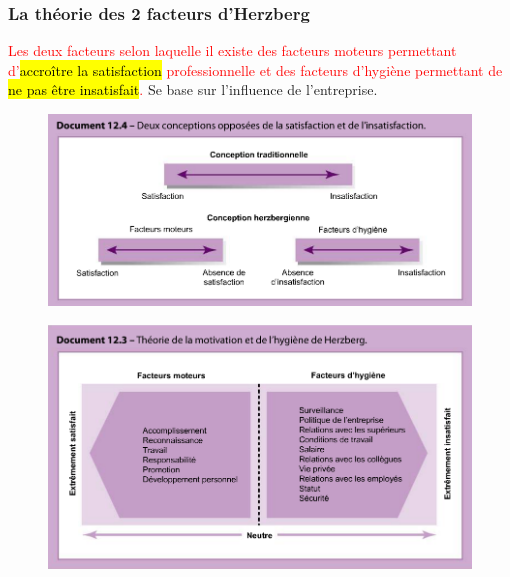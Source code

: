 \documentclass[letterpaper, 12pt]{article}
\newcommand{\red}[1]{
	\textcolor{red}{#1}
}
\begin{document}
		\subsubsection{La théorie des 2 facteurs d'Herzberg}
			\red{Les deux facteurs selon laquelle il existe des facteurs moteurs permettant d'\hl{accro\^itre 
				la satisfaction} professionnelle et des facteurs d'hygiène permettant de \hl{ne pas
				\^etre insatisfait}.} Se base sur l'influence de l'entreprise.
			\begin{figure}[H]
				\centering
				\includegraphics[scale=0.75]{Images/herzberg2}
			\end{figure}\noindent
			\begin{figure}[H]
				\centering
				\includegraphics[scale=0.75]{Images/herzberg}
			\end{figure}\noindent
\end{document}

